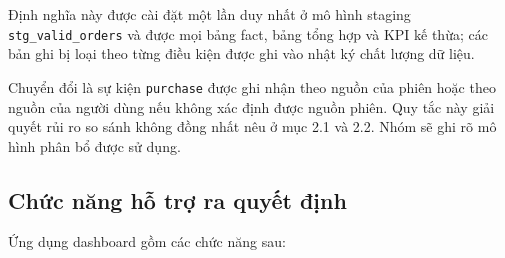 Định nghĩa này được cài đặt một lần duy nhất ở mô hình staging \texttt{stg\_valid\_orders} và được mọi bảng fact, bảng tổng hợp và KPI kế thừa; các bản ghi bị loại theo từng điều kiện được ghi vào nhật ký chất lượng dữ liệu. \medskip

Chuyển đổi là sự kiện \texttt{purchase} được ghi nhận theo nguồn của phiên hoặc theo nguồn của người dùng nếu không xác định được nguồn phiên. Quy tắc này giải quyết rủi ro so sánh không đồng nhất nêu ở mục 2.1 và 2.2. Nhóm sẽ ghi rõ mô hình phân bổ được sử dụng.

\subsection{Chức năng hỗ trợ ra quyết định}

Ứng dụng dashboard gồm các chức năng sau:

